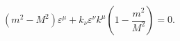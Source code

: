 \begin{equation}
(m^2 - M^2) \varepsilon^\mu + k_\nu \varepsilon^\nu k^\mu (1 - \frac{m^2}{M^2})
=0.
\label{59}
\end{equation}

